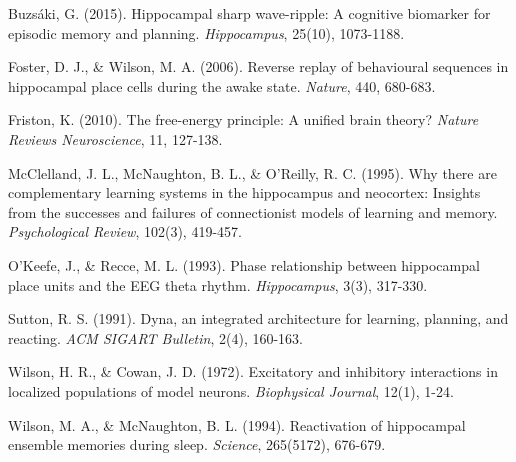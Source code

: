 \documentclass[11pt, a4paper]{article}
\begin{document}
Buzsáki, G. (2015). Hippocampal sharp wave-ripple: A cognitive biomarker for episodic memory and planning. \textit{Hippocampus}, 25(10), 1073-1188.

Foster, D. J., \& Wilson, M. A. (2006). Reverse replay of behavioural sequences in hippocampal place cells during the awake state. \textit{Nature}, 440, 680-683.

Friston, K. (2010). The free-energy principle: A unified brain theory? \textit{Nature Reviews Neuroscience}, 11, 127-138.

McClelland, J. L., McNaughton, B. L., \& O'Reilly, R. C. (1995). Why there are complementary learning systems in the hippocampus and neocortex: Insights from the successes and failures of connectionist models of learning and memory. \textit{Psychological Review}, 102(3), 419-457.

O'Keefe, J., \& Recce, M. L. (1993). Phase relationship between hippocampal place units and the EEG theta rhythm. \textit{Hippocampus}, 3(3), 317-330.

Sutton, R. S. (1991). Dyna, an integrated architecture for learning, planning, and reacting. \textit{ACM SIGART Bulletin}, 2(4), 160-163.

Wilson, H. R., \& Cowan, J. D. (1972). Excitatory and inhibitory interactions in localized populations of model neurons. \textit{Biophysical Journal}, 12(1), 1-24.

Wilson, M. A., \& McNaughton, B. L. (1994). Reactivation of hippocampal ensemble memories during sleep. \textit{Science}, 265(5172), 676-679.
\end{document}
